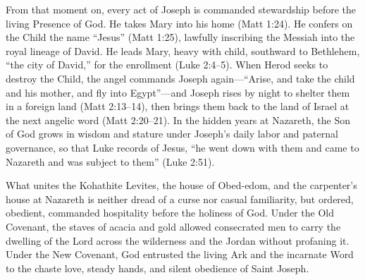 From that moment on, every act of Joseph is commanded stewardship before the living Presence of God. He takes Mary into his home (Matt 1:24). He confers on the Child the name ``Jesus'' (Matt 1:25), lawfully inscribing the Messiah into the royal lineage of David. He leads Mary, heavy with child, southward to Bethlehem, ``the city of David,'' for the enrollment (Luke 2:4--5). When Herod seeks to destroy the Child, the angel commands Joseph again---``Arise, and take the child and his mother, and fly into Egypt''---and Joseph rises by night to shelter them in a foreign land (Matt 2:13--14), then brings them back to the land of Israel at the next angelic word (Matt 2:20--21). In the hidden years at Nazareth, the Son of God grows in wisdom and stature under Joseph's daily labor and paternal governance, so that Luke records of Jesus, ``he went down with them and came to Nazareth and was subject to them'' (Luke 2:51).

What unites the Kohathite Levites, the house of Obed-edom, and the carpenter's house at Nazareth is neither dread of a curse nor casual familiarity, but ordered, obedient, commanded hospitality before the holiness of God. Under the Old Covenant, the staves of acacia and gold allowed consecrated men to carry the dwelling of the Lord across the wilderness and the Jordan without profaning it. Under the New Covenant, God entrusted the living Ark and the incarnate Word to the chaste love, steady hands, and silent obedience of Saint Joseph.
